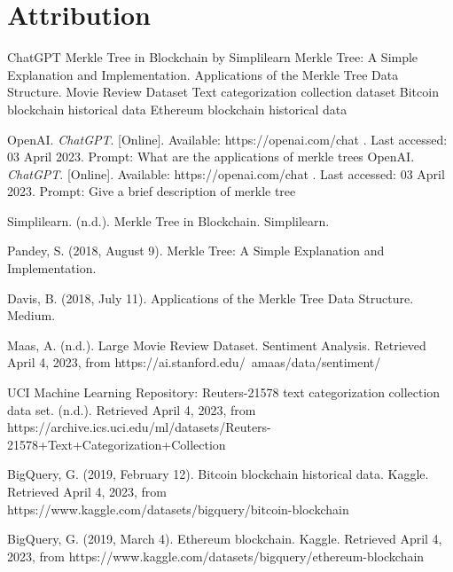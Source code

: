 \documentclass{article}
\begin{document}
\section{Attribution}
ChatGPT
\newline
Merkle Tree in Blockchain by Simplilearn
\newline
Merkle Tree: A Simple Explanation and Implementation. 
\newline
Applications of the Merkle Tree Data Structure.
\newline
Movie Review Dataset
\newline
Text categorization collection dataset
\newline
Bitcoin blockchain historical data
\newline
Ethereum blockchain historical data

  \begin{thebibliography}{9}
  OpenAI. \textit{ChatGPT}. [Online]. Available: https://openai.com/chat . Last accessed: 03 April 2023. Prompt: What are the applications of merkle trees
  OpenAI. \textit{ChatGPT}. [Online]. Available: https://openai.com/chat . Last accessed: 03 April 2023. Prompt: Give a brief description of merkle tree

  Simplilearn. (n.d.). Merkle Tree in Blockchain. Simplilearn. 

  Pandey, S. (2018, August 9). Merkle Tree: A Simple Explanation and Implementation. 

  Davis, B. (2018, July 11). Applications of the Merkle Tree Data Structure. Medium. 

  Maas, A. (n.d.). Large Movie Review Dataset. Sentiment Analysis. Retrieved April 4, 2023, from https://ai.stanford.edu/~amaas/data/sentiment/ 

  UCI Machine Learning Repository: Reuters-21578 text categorization collection data set. (n.d.). Retrieved April 4, 2023, from https://archive.ics.uci.edu/ml/datasets/Reuters-21578+Text+Categorization+Collection 

  BigQuery, G. (2019, February 12). Bitcoin blockchain historical data. Kaggle. Retrieved April 4, 2023, from https://www.kaggle.com/datasets/bigquery/bitcoin-blockchain

  BigQuery, G. (2019, March 4). Ethereum blockchain. Kaggle. Retrieved April 4, 2023, from https://www.kaggle.com/datasets/bigquery/ethereum-blockchain

  \end{thebibliography}
\end{document}
